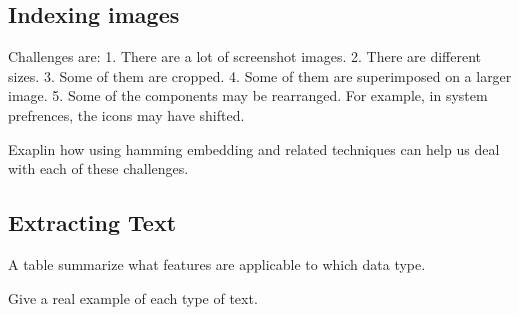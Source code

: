 \documentclass{www2010-submission}
\begin{document}
%




\subsection{Indexing images}
Challenges are:
1. There are a lot of screenshot images.
2. There are different sizes.
3. Some of them are cropped.
4. Some of them are superimposed on a larger image.
5. Some of the components may be rearranged. For example,
in system prefrences, the icons may have shifted.

Exaplin how using hamming embedding and related techniques can
help us deal with each of these challenges.

\subsection{Extracting Text}

A table summarize what features are applicable to which data type.

Give a real example of each type of text.
\end{document}
